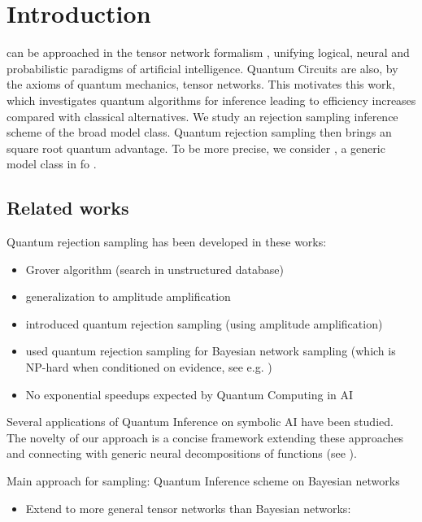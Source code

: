 \section{Introduction}

\neuroSymbolicAI{} can be approached in the tensor network formalism \tnreason{} \cite{goessmann_tensor_2026}, unifying logical, neural and probabilistic paradigms of artificial intelligence.
Quantum Circuits are also, by the axioms of quantum mechanics, tensor networks.
This motivates this work, which investigates quantum algorithms for inference leading to efficiency increases compared with classical alternatives.
We study an rejection sampling inference scheme of the broad model class.
Quantum rejection sampling then brings an square root quantum advantage.
To be more precise, we consider \ComputationActivationNetworks{}, a generic model class in \tnreason{} fo \neuroSymbolicAI{}.

\subsection{Related works}

Quantum rejection sampling has been developed in these works:
\begin{itemize}
    \item \cite{grover_fast_1996} Grover algorithm (search in unstructured database)
    \item \cite{brassard_exact_1997,brassard_quantum_2002} generalization to amplitude amplification
    \item \cite{ozols_quantum_2013} introduced quantum rejection sampling (using amplitude amplification)
    \item \cite{low_quantum_2014} used quantum rejection sampling for Bayesian network sampling (which is NP-hard when conditioned on evidence, see e.g. \cite{koller_probabilistic_2009})
    \item No exponential speedups expected by Quantum Computing in AI \cite{bennett_strengths_1997}
\end{itemize}

Several applications of Quantum Inference on symbolic AI have been studied.
The novelty of our approach is a concise framework extending these approaches and connecting with generic neural decompositions of functions (see \computationCircuits{}).

Main approach for sampling: Quantum Inference scheme on Bayesian networks \cite{low_quantum_2014}
\begin{itemize}
    \item Extend to more general tensor networks than Bayesian networks: \ComputationActivationNetworks{}
\end{itemize}

